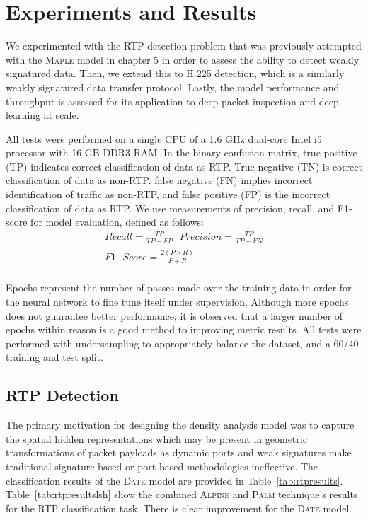 \section{Experiments and Results}

We experimented with the RTP detection problem that was previously attempted with the \textsc{Maple} model in chapter 5 in order to assess the ability to detect weakly signatured data. Then, we extend this to H.225 detection, which is a similarly weakly signatured data transfer protocol. Lastly, the model performance and throughput is assessed for its application to deep packet inspection and deep learning at scale.

All tests were performed on a single CPU of a 1.6 GHz dual-core Intel i5 processor with 16 GB DDR3 RAM. In the binary confusion matrix, true positive (TP) indicates correct classification of data as RTP. True negative (TN) is correct classification of data as non-RTP. false negative (FN) implies incorrect identification of traffic as non-RTP, and false positive (FP) is the incorrect classification of data as RTP. We use measurements of precision, recall, and F1-score for model evaluation, defined as follows:
\begin{equation}
\begin{split}
    Recall = \frac{TP}{TP + FP} \text{  }
    Precision = \frac{TP}{TP + FN} \\
    F1\text{ }Score = \frac{2(P\times R)}{P + R} \\
    \end{split}
\end{equation}

Epochs represent the number of passes made over the training data in order for the neural network to fine tune itself under supervision. Although more epochs does not guarantee better performance, it is observed that a larger number of epochs within reason is a good method to improving metric results. All tests were performed with undersampling to appropriately balance the dataset, and a 60/40 training and test split.

\subsection{RTP Detection}
The primary motivation for designing the density analysis model was to capture the spatial hidden representations which may be present in geometric transformations of packet payloads as dynamic ports and weak signatures make traditional signature-based or port-based methodologies ineffective. The classification results of the \textsc{Date} model are provided in Table~\ref{tab:rtpresults}. Table~\ref{tab:rtpresultslsh} show the combined \textsc{Alpine} and \textsc{Palm} technique's results for the RTP classification task. There is clear improvement for the \textsc{Date} model.

